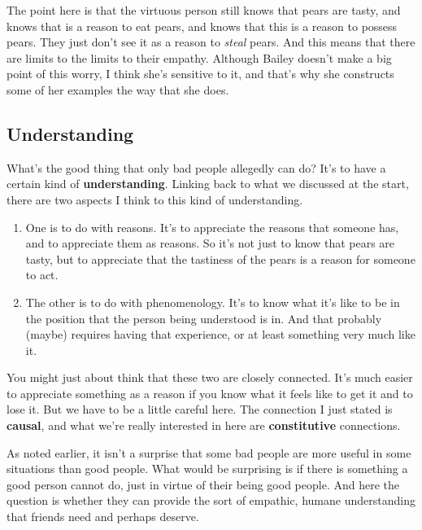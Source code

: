\documentclass[
]{article}
\providecommand{\tightlist}{%
  \setlength{\itemsep}{0pt}\setlength{\parskip}{0pt}}
\begin{document}
The point here is that the virtuous person still knows that pears are
tasty, and knows that is a reason to eat pears, and knows that this is a
reason to possess pears. They just don't see it as a reason to
\emph{steal} pears. And this means that there are limits to the limits
to their empathy. Although Bailey doesn't make a big point of this
worry, I think she's sensitive to it, and that's why she constructs some
of her examples the way that she does.

\hypertarget{understanding}{%
\subsection{Understanding}\label{understanding}}

What's the good thing that only bad people allegedly can do? It's to
have a certain kind of \textbf{understanding}. Linking back to what we
discussed at the start, there are two aspects I think to this kind of
understanding.

\begin{enumerate}
\def\labelenumi{\arabic{enumi}.}
\tightlist
\item
  One is to do with reasons. It's to appreciate the reasons that someone
  has, and to appreciate them as reasons. So it's not just to know that
  pears are tasty, but to appreciate that the tastiness of the pears is
  a reason for someone to act.
\item
  The other is to do with phenomenology. It's to know what it's like to
  be in the position that the person being understood is in. And that
  probably (maybe) requires having that experience, or at least
  something very much like it.
\end{enumerate}

You might just about think that these two are closely connected. It's
much easier to appreciate something as a reason if you know what it
feels like to get it and to lose it. But we have to be a little careful
here. The connection I just stated is \textbf{causal}, and what we're
really interested in here are \textbf{constitutive} connections.

As noted earlier, it isn't a surprise that some bad people are more
useful in some situations than good people. What would be surprising is
if there is something a good person cannot do, just in virtue of their
being good people. And here the question is whether they can provide the
sort of empathic, humane understanding that friends need and perhaps
deserve.
\end{document}

